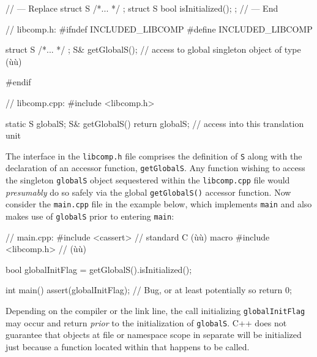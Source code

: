 \begin{emcppshiddenlisting}[emcppsbatch=e7]
// --- Replace
struct S { /*... */ };
struct S {
  bool isInitialized();
};
// --- End
\end{emcppshiddenlisting}
\begin{emcppslisting}[emcppsbatch=e7]
// libcomp.h:
#ifndef INCLUDED_LIBCOMP
#define INCLUDED_LIBCOMP

struct S { /*... */ };
S& getGlobalS();  // access to global singleton object of type (ù{}ù)

#endif
\end{emcppslisting}


\begin{emcppslisting}[emcppsbatch=e7]
// libcomp.cpp:
#include <libcomp.h>

static S globalS;
S& getGlobalS() { return globalS; }  // access into this translation unit
\end{emcppslisting}

\noindent The interface in the \lstinline!libcomp.h! file comprises the definition of
\lstinline!S! along with the declaration of an accessor function,
\lstinline!getGlobalS!. Any function wishing to access the singleton
\lstinline!globalS! object sequestered within the \lstinline!libcomp.cpp! file
would \emph{presumably} do so safely via the global
\lstinline!getGlobalS()! accessor function. Now consider the
\lstinline!main.cpp! file in the example below, which implements
\lstinline!main! and also makes use of \lstinline!globalS! prior to entering
\lstinline!main!:

\begin{emcppslisting}[emcppsbatch=e7]
// main.cpp:
#include <cassert>    // standard C (ù{}ù) macro
#include <libcomp.h>  // (ù{}ù)

bool globalInitFlag = getGlobalS().isInitialized();

int main()
{
    assert(globalInitFlag);   // Bug, or at least potentially so
    return 0;
}
\end{emcppslisting}

\noindent Depending on the compiler or the link line, the call
initializing \lstinline!globalInitFlag! may occur and return \emph{prior}
to the initialization of  \lstinline!globalS!.  C++ does not guarantee that objects at
file or namespace scope in separate  will be
initialized just because a function located within that 
happens to be called.

